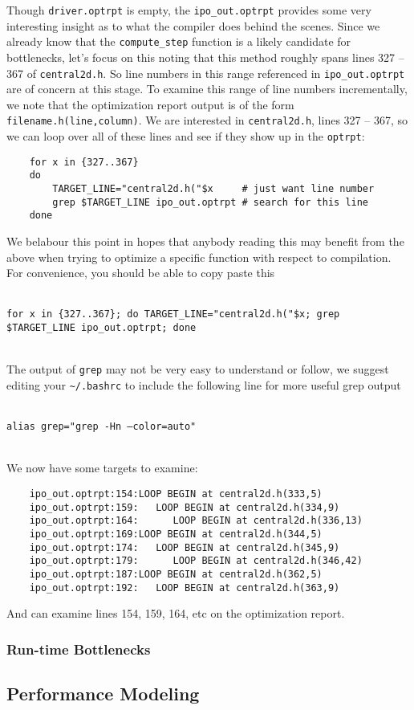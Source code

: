Though \texttt{driver.optrpt} is empty, the \texttt{ipo\_out.optrpt} provides some very interesting insight as to what the compiler does behind the scenes.  Since we already know that the \texttt{compute\_step} function is a likely candidate for bottlenecks, let's focus on this noting that this method roughly spans lines 327 -- 367 of \texttt{central2d.h}.  So line numbers in this range referenced in \texttt{ipo\_out.optrpt} are of concern at this stage.  To examine this range of line numbers incrementally, we note that the optimization report output is of the form \texttt{filename.h(line,column)}.  We are interested in \texttt{central2d.h}, lines 327 -- 367, so we can loop over all of these lines and see if they show up in the \texttt{optrpt}:

\begin{lstlisting}
    for x in {327..367}
    do
        TARGET_LINE="central2d.h("$x     # just want line number
        grep $TARGET_LINE ipo_out.optrpt # search for this line
    done
\end{lstlisting}

We belabour this point in hopes that anybody reading this may benefit from the above when trying to optimize a specific function with respect to compilation.  For convenience, you should be able to copy paste this\\\\ \centerline{{\small \texttt{for x in \{327..367\}; do TARGET\_LINE="central2d.h("\$x; grep \$TARGET\_LINE ipo\_out.optrpt; done}}}\\

The output of \texttt{grep} may not be very easy to understand or follow, we suggest editing your \texttt{\textasciitilde/.bashrc} to include the following line for more useful grep output\\\\ \centerline{\texttt{alias grep="grep -Hn --color=auto"}}\\

\noindent We now have some targets to examine:

\begin{lstlisting}
    ipo_out.optrpt:154:LOOP BEGIN at central2d.h(333,5)
    ipo_out.optrpt:159:   LOOP BEGIN at central2d.h(334,9)
    ipo_out.optrpt:164:      LOOP BEGIN at central2d.h(336,13)
    ipo_out.optrpt:169:LOOP BEGIN at central2d.h(344,5)
    ipo_out.optrpt:174:   LOOP BEGIN at central2d.h(345,9)
    ipo_out.optrpt:179:      LOOP BEGIN at central2d.h(346,42)
    ipo_out.optrpt:187:LOOP BEGIN at central2d.h(362,5)
    ipo_out.optrpt:192:   LOOP BEGIN at central2d.h(363,9)
\end{lstlisting}

\noindent And can examine lines 154, 159, 164, etc on the optimization report.

\subsubsection{Run-time Bottlenecks}
\label{sec-profile-bottlenecks-run-time}

\subsection{Performance Modeling}
\label{sec-profile-modeling}
